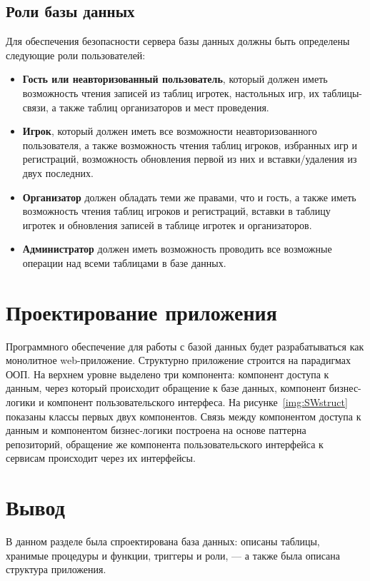 
\subsection{Роли базы данных}

Для обеспечения безопасности сервера базы данных должны быть определены
следующие роли пользователей:

\begin{itemize}
    \item \textbf{Гость или неавторизованный пользователь}, который должен иметь
        возможность чтения записей из таблиц игротек, настольных игр, их
        таблицы-связи, а также таблиц организаторов и мест проведения.
    \item \textbf{Игрок}, который должен иметь все возможности неавторизованного
        пользователя, а также возможность чтения таблиц игроков, избранных игр и
        регистраций, возможность обновления первой из них и вставки/удаления из
        двух последних.
    \item \textbf{Организатор} должен обладать теми же правами, что и гость, а
        также иметь возможность чтения таблиц игроков и регистраций, вставки в
        таблицу игротек и обновления записей в таблице игротек и организаторов.
    \item \textbf{Администратор} должен иметь возможность проводить все
        возможные операции над всеми таблицами в базе данных.
\end{itemize}

\section{Проектирование приложения}

Программного обеспечение для работы с базой данных будет разрабатываться как
монолитное web-приложение.  Структурно приложение строится на парадигмах ООП. На
верхнем уровне выделено три компонента: компонент доступа к данным, через
который происходит обращение к базе данных, компонент бизнес-логики и компонент
пользовательского интерфеса.  На рисунке~\ref{img:SWstruct} показаны классы
первых двух компонентов.  Связь между компонентом доступа к данным и компонентом
бизнес-логики построена на основе паттерна репозиторий, обращение же компонента
пользовательского интерфейса к сервисам происходит через их интерфейсы.

\section*{Вывод}

В данном разделе была спроектирована база данных: описаны таблицы, хранимые
процедуры и функции, триггеры и роли, --- а также была описана структура
приложения.

\clearpage
{}
~\\
~\\
~\\
